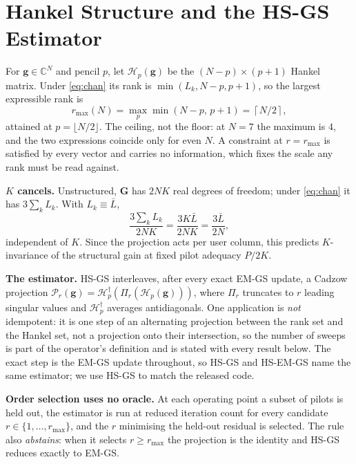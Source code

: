 \documentclass[journal]{IEEEtran}
\newcommand{\bG}{\mathbf{G}}
\newcommand{\bg}{\mathbf{g}}
\newcommand{\Hank}{\mathcal{H}}
\newcommand{\rmax}{r_{\max}}
\begin{document}
\section{Hankel Structure and the HS-GS Estimator}
\label{sec:method}

For $\bg\in\mathbb{C}^N$ and pencil $p$, let $\Hank_p(\bg)$ be the
$(N-p)\times(p+1)$ Hankel matrix. Under \eqref{eq:chan} its rank is
$\min(L_k,N-p,p+1)$, so the largest expressible rank is
\begin{equation}
\rmax(N)=\max_{p}\min(N-p,\,p+1)=\left\lceil N/2\right\rceil,
\label{eq:cap}
\end{equation}
attained at $p=\lfloor N/2\rfloor$. The ceiling, not the floor: at $N=7$ the
maximum is $4$, and the two expressions coincide only for even $N$. A
constraint at $r=\rmax$ is satisfied by every vector and carries no
information, which fixes the scale any rank must be read against.

\textbf{$K$ cancels.} Unstructured, $\bG$ has $2NK$ real degrees of freedom;
under \eqref{eq:chan} it has $3\sum_k L_k$. With $L_k\equiv\bar L$,
\begin{equation}
\frac{3\sum_k L_k}{2NK}=\frac{3K\bar L}{2NK}=\frac{3\bar L}{2N},
\label{eq:compress}
\end{equation}
independent of $K$. Since the projection acts per user column, this predicts
$K$-invariance of the structural gain at fixed pilot adequacy $P/2K$.

\textbf{The estimator.} HS-GS interleaves, after every exact EM-GS update, a
Cadzow projection $\mathcal{P}_r(\bg)=\Hank_p^{\dagger}(\Pi_r(\Hank_p(\bg)))$,
where $\Pi_r$ truncates to $r$ leading singular values and $\Hank_p^{\dagger}$
averages antidiagonals. One application is \emph{not} idempotent: it is one
step of an alternating projection between the rank set and the Hankel set, not
a projection onto their intersection, so the number of sweeps is part of the
operator's definition and is stated with every result below. The exact step is
the EM-GS update throughout, so HS-GS and HS-EM-GS name the same estimator; we
use HS-GS to match the released code.

\textbf{Order selection uses no oracle.} At each operating point a subset of
pilots is held out, the estimator is run at reduced iteration count for every
candidate $r\in\{1,\dots,\rmax\}$, and the $r$ minimising the held-out residual
is selected. The rule also \emph{abstains}: when it selects $r\ge\rmax$ the
projection is the identity and HS-GS reduces exactly to EM-GS.
\end{document}
